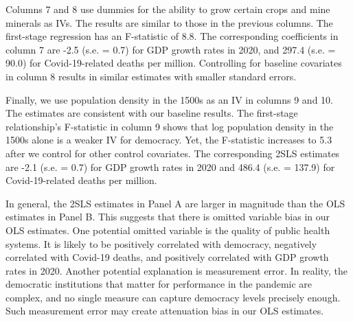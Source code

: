 Columns 7 and 8 use dummies for the ability to grow certain crops and mine minerals as IVs. The results are similar to those in the previous columns. The first-stage regression has an F-statistic of 8.8. The corresponding coefficients in column 7 are -2.5 (s.e. = 0.7) for GDP growth rates in 2020, and 297.4 (s.e. = 90.0) for Covid-19-related deaths per million. Controlling for baseline covariates in column 8 results in similar estimates with smaller standard errors. 


Finally, we use population density in the 1500s as an IV in columns 9 and 10. The estimates are consistent with our baseline results. The first-stage relationship's F-statistic in column 9 shows that log population density in the 1500s alone is a weaker IV for democracy. Yet, the F-statistic increases to 5.3 after we control for other control covariates. The corresponding 2SLS estimates are -2.1 (s.e. = 0.7) for GDP growth rates in 2020 and 486.4 (s.e. = 137.9) for Covid-19-related deaths per million. 

In general, the 2SLS estimates in Panel A are larger in magnitude than the OLS estimates in Panel B. This suggests that there is omitted variable bias in our OLS estimates. One potential omitted variable is the quality of public health systems. It is likely to be positively correlated with democracy, negatively correlated with Covid-19 deaths, and positively correlated with GDP growth rates in 2020. Another potential explanation is measurement error. In reality, the democratic institutions that matter for performance in the pandemic are complex, and no single measure can capture democracy levels precisely enough. Such measurement error may create attenuation bias in our OLS estimates. 